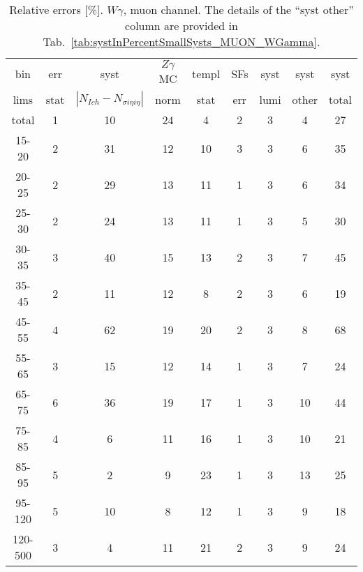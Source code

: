 \begin{table}[h]
  \scriptsize
  \begin{center}
  \caption{Relative errors [\%]. $W\gamma$, muon channel. The details of the ``syst other'' column are provided in Tab.~\ref{tab:systInPercentSmallSysts_MUON_WGamma}. }
   \begin{tabular}{|c|c|c|c|c|c|c|c|c|}
    bin  & err & syst & $Z\gamma$ MC & templ & SFs & syst & syst & syst\\
    lims  & stat & $|N_{Ich}-N_{\sigma{i\eta i\eta}}|$ & norm & stat & err & lumi & other & total\\ \hline
    total  & 1 & 10 & 24 & 4 & 2 & 3 & 4 & 27 \\ \hline
    15-20 & 2 & 31 & 12 & 10 & 3 & 3 & 6 & 35 \\ \hline
    20-25 & 2 & 29 & 13 & 11 & 1 & 3 & 6 & 34 \\ \hline
    25-30 & 2 & 24 & 13 & 11 & 1 & 3 & 5 & 30 \\ \hline
    30-35 & 3 & 40 & 15 & 13 & 2 & 3 & 7 & 45 \\ \hline
    35-45 & 2 & 11 & 12 & 8 & 2 & 3 & 6 & 19 \\ \hline
    45-55 & 4 & 62 & 19 & 20 & 2 & 3 & 8 & 68 \\ \hline
    55-65 & 3 & 15 & 12 & 14 & 1 & 3 & 7 & 24 \\ \hline
    65-75 & 6 & 36 & 19 & 17 & 1 & 3 & 10 & 44 \\ \hline
    75-85 & 4 & 6 & 11 & 16 & 1 & 3 & 10 & 21 \\ \hline
    85-95 & 5 & 2 & 9 & 23 & 1 & 3 & 13 & 25 \\ \hline
    95-120 & 5 & 10 & 8 & 12 & 1 & 3 & 9 & 18 \\ \hline
    120-500 & 3 & 4 & 11 & 21 & 2 & 3 & 9 & 24 \\ \hline
  \end{tabular}
  \label{tab:systInPercent_MUON_WGamma}
  \end{center}
\end{table}


